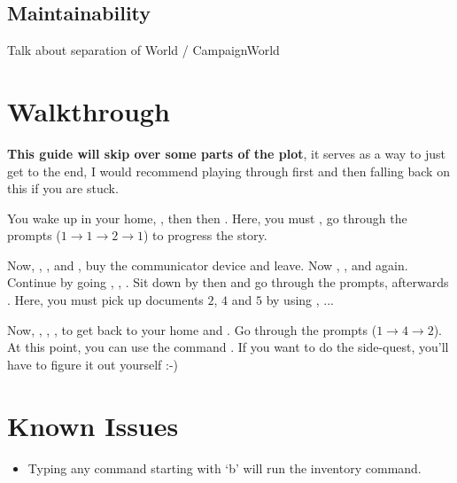 \documentclass{article}
\begin{document}
\begin{multicols}{2}
            \subsection{Maintainability}
                Talk about separation of World / CampaignWorld

        \section{Walkthrough}
            \textbf{\color{cRed}This guide will skip over some parts of the plot}, it serves as a way to just get to the end, I would recommend playing through first and then falling back on this if you are stuck.

            You wake up in your home, , then  then . Here, you must , go through the prompts ($1 \rightarrow 1 \rightarrow 2 \rightarrow 1$) to progress the story. 

            Now, , ,  and , buy the communicator device and leave. Now , ,  and  again. Continue by going , , . Sit down by  then  and go through the prompts, afterwards . Here, you must pick up documents $2$, $4$ and $5$ by using , ...

            Now, , , ,  to get back to your home and . Go through the prompts ($1 \rightarrow 4 \rightarrow 2$). At this point, you can use the command . If you want to do the side-quest, you'll have to figure it out yourself :-)

        \section{Known Issues}
        
            \begin{itemize}[leftmargin=*]
                \item Typing any command starting with `b' will run the inventory command.
            \end{itemize}

    \end{multicols}
\end{document}
